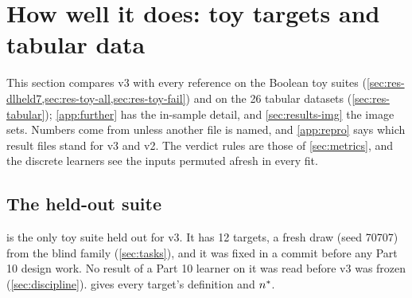 \section{How well it does: toy targets and tabular data}\label{sec:results-toy}

This section compares v3 with every reference on the Boolean toy suites (\cref{sec:res-dlheld7,sec:res-toy-all,sec:res-toy-fail}) and on the 26 tabular datasets (\cref{sec:res-tabular}); \cref{app:further} has the in-sample detail, and \cref{sec:results-img} the image sets. Numbers come from  unless another file is named, and \cref{app:repro} says which result files stand for v3 and v2. The verdict rules are those of \cref{sec:metrics}, and the discrete learners see the inputs permuted afresh in every fit.

\subsection{The held-out suite }\label{sec:res-dlheld7}

 is the only toy suite held out for v3. It has 12 targets, a fresh draw (seed 70707) from the blind family (\cref{sec:tasks}), and it was fixed in a commit before any Part 10 design work. No result of a Part 10 learner on it was read before v3 was frozen (\cref{sec:discipline}).  gives every target's definition and $\nstar$.

\begin{table}[t]
\centering{\footnotesize\setlength{\tabcolsep}{3pt}\renewcommand{\arraystretch}{1.15}
}
\caption{The held-out toy suite : $\nstar$, the training-set size at 10\% test error (mean of 3 seeds, interpolated in $\log n$), for v3, v2, the three pre-registered network variants, their per-target minimum , and the calibration references  and  . v3 and v2 see the inputs permuted per fit. ``never'': 10\% error is not reached by $n=16384$. In the definitions, $[\cdot]$ is $+1$ when the condition holds and $-1$ otherwise; \texttt{*} multiplies $\pm1$ values; \texttt{c ? a : b} is a multiplexer ($a$ when $c=+1$); a literal \texttt{x5} or \texttt{$-$x5} inside AND/OR, a decision-list rule or a selector stands for $x_5=+1$ or $x_5=-1$. f7\_02, f7\_04 and f7\_06 are the family's non-symmetric controls. Source: .}
\label{tab:dlheld7}
\end{table}

